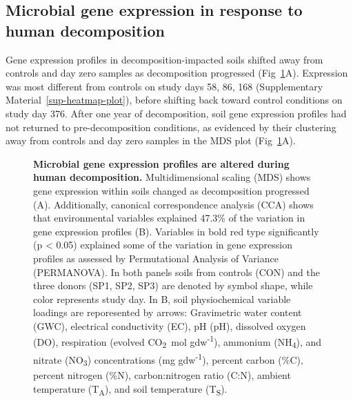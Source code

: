 \documentclass[
  sn-nature,
  lineno, referee]{sn-jnl}
\begin{document}
\subsection{Microbial gene expression in response to human
decomposition}\label{microbial-gene-expression-in-response-to-human-decomposition}

Gene expression profiles in decomposition-impacted soils shifted away
from controls and day zero samples as decomposition progressed
(Fig~\ref{fig-mds}A). Expression was most different from controls on
study days 58, 86, 168 (Supplementary Material~\ref{sup-heatmap-plot}),
before shifting back toward control conditions on study day 376. After
one year of decomposition, soil gene expression profiles had not
returned to pre-decomposition conditions, as evidenced by their
clustering away from controls and day zero samples in the MDS plot
(Fig~\ref{fig-mds}A).

\begin{figure}[!h]
\caption{{\bf Microbial gene expression profiles are altered during human decomposition.}
Multidimensional scaling (MDS) shows gene expression within soils changed as decomposition progressed (A). Additionally, canonical correspondence analysis (CCA) shows that environmental variables explained 47.3\% of the variation in gene expression profiles (B). Variables in bold red type significantly (p < 0.05) explained some of the variation in gene expression profiles as assessed by Permutational Analysis of Variance (PERMANOVA). In both panels soils from controls (CON) and the three donors (SP1, SP2, SP3) are denoted by symbol shape, while color represents study day. In B, soil physiochemical variable loadings are reporesented by arrows: Gravimetric water content (GWC), electrical conductivity (EC), pH (pH), dissolved oxygen (DO), respiration (evolved CO\textsubscript{2}\ \textmu mol gdw\textsuperscript{-1}), ammonium (NH\textsubscript{4}), and nitrate (NO\textsubscript{3}) concentrations (mg gdw\textsuperscript{-1}), percent carbon (\%C), percent nitrogen (\%N), carbon:nitrogen ratio (C:N), ambient temperature (T\textsubscript{A}), and soil temperature (T\textsubscript{S}).}
\label{fig-mds}
\end{figure}
\end{document}

